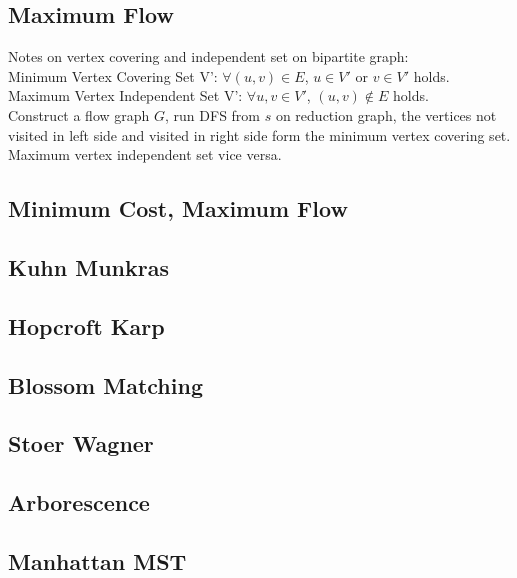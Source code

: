 \documentclass[10pt]{article}
\begin{document}
\subsection{Maximum Flow}

Notes on vertex covering and independent set on bipartite graph:\\
Minimum Vertex Covering Set V': $\forall (u,v) \in E$, $u \in V'$ or $v \in V'$ holds. \\
Maximum Vertex Independent Set V': $\forall u,v \in V'$, $(u,v) \notin E$ holds.\\
Construct a flow graph $G$, run DFS from $s$ on reduction graph, the vertices not visited in left side and visited in right side form the minimum vertex covering set.\\
Maximum vertex independent set vice versa.\\
\subsection{Minimum Cost, Maximum Flow}

\subsection{Kuhn Munkras}

\subsection{Hopcroft Karp}

\subsection{Blossom Matching}

\subsection{Stoer Wagner}

\subsection{Arborescence}

\subsection{Manhattan MST}

\end{document}
